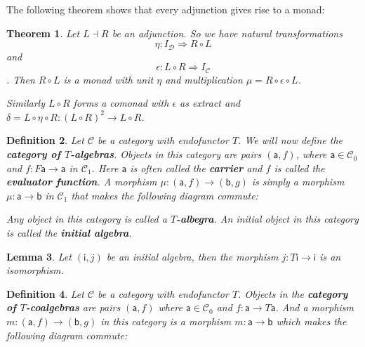 \documentclass{article}
\newcommand{\cat}[1]{\mathcal{#1}} %
\newcommand{\cato}[1]{\cat{#1}_0} %
\newcommand{\catm}[1]{\cat{#1}_1} %
\newcommand{\ob}[1]{\mathsf{#1}} %
\newtheorem{theorem}{Theorem}
\newtheorem{lemma}[theorem]{Lemma}
\newtheorem{definition}[theorem]{Definition}
\begin{document}
The following theorem shows that every adjunction gives rise to a monad:

\begin{theorem}
	Let $L \dashv R$ be an adjunction. So we have natural transformations $$\eta: I_\cat{D} \Rightarrow R \circ L$$ and $$ \epsilon: L \circ R \Rightarrow I_\cat{C} $$.
	Then $R \circ L$ is a monad with unit $\eta$ and multiplication $\mu = R \circ \epsilon \circ L$.

	Similarly $L \circ R$ forms a comonad with $\epsilon$ as extract and $\delta = L \circ \eta \circ R: (L \circ R)^2 \rightarrow L \circ R$.
\end{theorem}

\begin{definition}
	Let $\cat{C}$ be a category with endofunctor $T$. We will now define the \textbf{category of $T$-algebras}.
	Objects in this category are pairs $(\ob{a}, f)$, where $\ob{a} \in \cato{C}$ and $f: F\ob{a} \rightarrow \ob{a}$ in $\catm{C}$.
	Here $\ob{a}$ is often called the \textbf{carrier} and $f$ is called the \textbf{evaluator function}.
	A morphism $\mu: (\ob{a}, f) \rightarrow (\ob{b}, g)$ is simply a morphism $\mu: \ob{a} \rightarrow \ob{b}$ in $\catm{C}$ that makes the following diagram commute:


	Any object in this category is called a \textbf{$T$-albegra}.
	An initial object in this category is called the \textbf{initial algebra}.
\end{definition}

\begin{lemma}
	Let $(\ob{i}, j)$ be an initial algebra, then the morphism $j: T\ob{i} \rightarrow \ob{i}$ is an isomorphism.
\end{lemma}

\begin{definition}
	Let $\cat{C}$ be a category with endofunctor $T$. Objects in the \textbf{category of $T$-coalgebras} are pairs $(\ob{a}, f)$ where $\ob{a} \in \cato{C}$ and $f: \ob{a} \rightarrow T\ob{a}$.
	And a morphism $m: (\ob{a}, f) \rightarrow (\ob{b}, g)$ in this category is a morphism $m: \ob{a} \rightarrow \ob{b}$ which makes the following diagram commute:

\end{definition}
\end{document}
